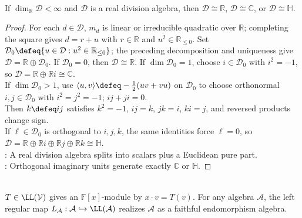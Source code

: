 \begin{theorem} \label{thm:frobenius-real-division-algebras} \\
If $\dim_{\mathbb{R}}\mathcal{D}<\infty$ and $\mathcal{D}$ is a real division algebra, then $\mathcal{D}\cong\mathbb{R}$, $\mathcal{D}\cong\mathbb{C}$, or $\mathcal{D}\cong\mathbb{H}$.
\begin{proof}
For each $d\in\mathcal{D}$, $m_d$ is linear or irreducible quadratic over $\mathbb{R}$; completing the square gives $d=r+u$ with $r\in\mathbb{R}$ and $u^2\in\mathbb{R}_{\le0}$. Set $\mathcal{D}_0\defeq\{u\in\mathcal{D}:u^2\in\mathbb{R}_{\le0}\}$; the preceding decomposition and uniqueness give $\mathcal{D}=\mathbb{R}\oplus\mathcal{D}_0$. If $\mathcal{D}_0=0$, then $\mathcal{D}\cong\mathbb{R}$. If $\dim\mathcal{D}_0=1$, choose $i\in\mathcal{D}_0$ with $i^2=-1$, so $\mathcal{D}=\mathbb{R}\oplus\mathbb{R}i\cong\mathbb{C}$.\\
If $\dim\mathcal{D}_0>1$, use $\langle u,v\rangle\defeq-\frac12(uv+vu)$ on $\mathcal{D}_0$ to choose orthonormal $i,j\in\mathcal{D}_0$ with $i^2=j^2=-1$; $ij+ji=0$.\\
Then $k\defeq ij$ satisfies $k^2=-1$, $ij=k$, $jk=i$, $ki=j$, and reversed products change sign.\\
If $\ell\in\mathcal{D}_0$ is orthogonal to $i,j,k$, the same identities force $\ell=0$, so $\mathcal{D}=\mathbb{R}\oplus\mathbb{R}i\oplus\mathbb{R}j\oplus\mathbb{R}k\cong\mathbb{H}$.\\
: A real division algebra splits into scalars plus a Euclidean pure part.\\
: Orthogonal imaginary units generate exactly $\mathbb{C}$ or $\mathbb{H}$.
\end{proof}
\end{theorem}

\begin{perspective} \label{per:algebra-chapter-operator-connection} \\
$T\in\LL(\mathcal{V})$ gives an $\mathbb{F}[x]$-module by $x\cdot v=T(v)$. For any algebra $\mathcal{A}$, the left regular map $L_{\mathcal{A}}:\mathcal{A}\hookrightarrow\LL(\mathcal{A})$ realizes $\mathcal{A}$ as a faithful endomorphism algebra.
\end{perspective}
